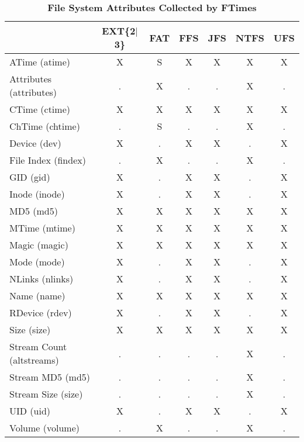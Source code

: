 \documentclass[10pt]{article}
\begin{document}
\begin{table}
\begin{center}
\caption{\bf File System Attributes Collected by FTimes\label{tbl:attributes}}

\vspace{.5em}
\begin{tabular}[h]{lcccccc}
 & EXT\{2$\mid$3\} & FAT & FFS & JFS & NTFS & UFS \\\hline
   ATime (atime)             & X &  S &  X &  X &  X &  X \\
   Attributes (attributes)   & . &  X &  . &  . &  X &  . \\
   CTime (ctime)             & X &  X &  X &  X &  X &  X \\
   ChTime (chtime)           & . &  S &  . &  . &  X &  . \\
   Device (dev)              & X &  . &  X &  X &  . &  X \\
   File Index (findex)       & . &  X &  . &  . &  X &  . \\
   GID (gid)                 & X &  . &  X &  X &  . &  X \\
   Inode (inode)             & X &  . &  X &  X &  . &  X \\
   MD5 (md5)                 & X &  X &  X &  X &  X &  X \\
   MTime (mtime)             & X &  X &  X &  X &  X &  X \\
   Magic (magic)             & X &  X &  X &  X &  X &  X \\
   Mode (mode)               & X &  . &  X &  X &  . &  X \\
   NLinks (nlinks)           & X &  . &  X &  X &  . &  X \\
   Name (name)               & X &  X &  X &  X &  X &  X \\
   RDevice (rdev)            & X &  . &  X &  X &  . &  X \\
   Size (size)               & X &  X &  X &  X &  X &  X \\
   Stream Count (altstreams) & . &  . &  . &  . &  X &  . \\
   Stream MD5 (md5)          & . &  . &  . &  . &  X &  . \\
   Stream Size (size)        & . &  . &  . &  . &  X &  . \\
   UID (uid)                 & X &  . &  X &  X &  . &  X \\
   Volume (volume)           & . &  X &  . &  . &  X &  . \\
\end{tabular}
\end{center}
\end{table}
\end{document}
